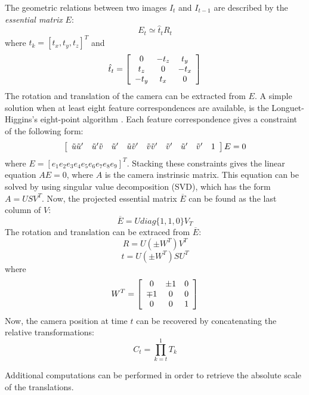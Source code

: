 The geometric relations between two images $I_t$ and $I_{t-1}$ are described by the \textit{essential matrix} $E$:
\begin{equation}
E_t \simeq \hat{t}_t R_t
\end{equation}
where $t_k = [t_x, t_y, t_z]^T$ and 
\begin{equation}
\hat{t}_t = 
\left[ \begin{array}{c c c}
0 & -t_z & t_y \\
t_z & 0 & -t_x \\
-t_y & t_x & 0
\end{array} \right]
\end{equation}
The rotation and translation of the camera can be extracted from $E$.
A simple solution when at least eight feature correspondences are available, is the Longuet-Higgins's eight-point algorithm \cite{longuet1987computer}.
Each feature correspondence gives a constraint of the following form:
\begin{equation}
\left[ \begin{array}{c c c c c c c c c}
\tilde{u}\tilde{u}' & \tilde{u}'\tilde{v} & \tilde{u}' & \tilde{u}\tilde{v}' & \tilde{v}\tilde{v}' & \tilde{v}' & \tilde{u}' & \tilde{v}' & 1
\end{array} \right]
E = 0
\end{equation}
where $E = [e_1  e_2  e_3  e_4  e_5  e_6  e_7  e_8  e_9]^T$.
Stacking these constraints gives the linear equation $A E = 0$, where $A$ is the camera instrinsic matrix.
This equation can be solved by using singular value decomposition (SVD), which has the form $A = USV^T$.
Now, the projected essential matrix $\overline{E}$ can be found as the last column of $V$:
\begin{equation}
\overline{E} = U diag\{1, 1, 0\} V_T
\end{equation}
The rotation and translation can be extraced from $\overline{E}$:
\begin{equation}
R = U (\pm W^T) V^T
\end{equation}
\begin{equation}
\hat{t} = U (\pm W^T) S U^T
\end{equation}
where
\begin{equation}
W^T =
\left[ \begin{array}{c c c}
0 & \pm 1 & 0 \\
\mp 1 & 0 & 0 \\
0 & 0 & 1
\end{array} \right]
\end{equation}
Now, the camera position at time $t$ can be recovered by concatenating the relative transformations:
\begin{equation}
C_t = \prod_{k=t}^1T_{k}
\end{equation}

Additional computations can be performed in order to retrieve the absolute scale of the translations.

